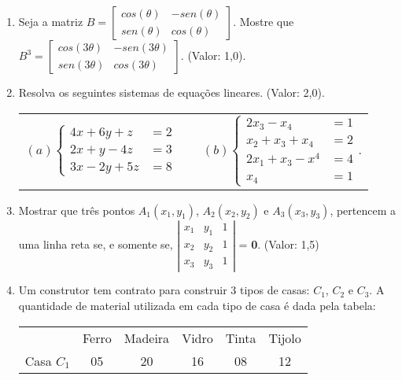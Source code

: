 \documentclass[12pt,a4paper]{article}
\begin{document}
\begin{enumerate}
\item Seja a matriz 
$\displaystyle B=\left[\begin{array}{cc}
cos(\theta)&-sen(\theta)\\
sen(\theta)&cos(\theta)
\end{array} \right]$. 
Mostre que 
$\displaystyle B^3=\left[\begin{array}{cc}
cos(3\theta)&-sen(3\theta)\\
sen(3\theta)&cos(3\theta)
\end{array} \right]$. (Valor: 1,0).

\item Resolva os seguintes sistemas de equações lineares. (Valor: 2,0).
\begin{center} 
\begin{tabular}{ccc}
$\displaystyle (a)\left\{\begin{array}{cc}
4x + 6y + z&= 2\\
2x + y - 4z &= 3\\
3x -2y +5z &= 8
\end{array} \right. $ &

&
$\displaystyle (b)\left\{\begin{array}{cc}
2x_3 - x_4 &= 1\\
x_2 + x_3 + x_4 &= 2\\
2x_1 + x_3 - x^4 &= 4\\
x_4 &= 1
\end{array} \right. $.
\end{tabular} \end{center}
\item Mostrar que três pontos $\displaystyle A_1(x_1, y_1)$, $\displaystyle A_2(x_2, y_2)$ e $\displaystyle A_3(x_3, y_3)$, pertencem a uma linha reta se, e somente se, $\displaystyle \left|\begin{array}{ccc}
x_1&y_1&1\\
x_2&y_2&1\\
x_3&y_3&1
\end{array} \right|$ = {\bf 0}. (Valor: 1,5)

\item Um construtor tem contrato para construir 3 tipos de casas: $\displaystyle C_1$, $\displaystyle C_2$ e $\displaystyle C_3$. A quantidade de material utilizada em cada tipo de casa é dada pela tabela:

\begin{center} 
\begin{tabular}{cccccc}
& Ferro&Madeira&Vidro&Tinta&Tijolo \\
Casa $ C_1 $ & 05 & 20 & 16 & 08 & 12 \\


\end{tabular}
\end{center}
\end{enumerate}
\end{document}
